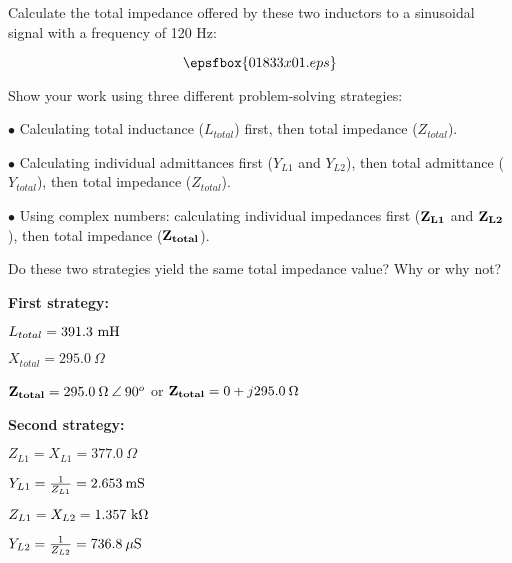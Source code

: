 

Calculate the total impedance offered by these two inductors to a sinusoidal signal with a frequency of 120 Hz:

$$\epsfbox{01833x01.eps}$$

Show your work using three different problem-solving strategies:

\medskip
\item{$\bullet$} Calculating total inductance ($L_{total}$) first, then total impedance ($Z_{total}$).
\item{$\bullet$} Calculating individual admittances first ($Y_{L1}$ and $Y_{L2}$), then total admittance ($Y_{total}$), then total impedance ($Z_{total}$).
\item{$\bullet$} Using complex numbers: calculating individual impedances first (${\bf Z_{L1}}$ and ${\bf Z_{L2}}$), then total impedance (${\bf Z_{total}}$).
\medskip

Do these two strategies yield the same total impedance value?  Why or why not?







\noindent
{\bf First strategy:}

$L_{total} = 391.3 \hbox{ mH}$

$X_{total} = 295.0 \> \Omega$

${\bf Z_{total}} = 295.0 \> \Omega \> \angle \> 90^o$ or ${\bf Z_{total}} = 0 + j295.0 \> \Omega$

\vskip 10pt

\goodbreak

\noindent
{\bf Second strategy:}

$Z_{L1} = X_{L1} = 377.0 \> \Omega$

\vskip 5pt

$Y_{L1} = {1 \over Z_{L1}} = 2.653 \> \hbox{mS}$

\vskip 5pt

$Z_{L1} = X_{L2} = 1.357 \hbox{ k}\Omega$

\vskip 5pt

$Y_{L2} = {1 \over Z_{L2}} = 736.8 \> \mu \hbox{S}$

\vskip 5pt

